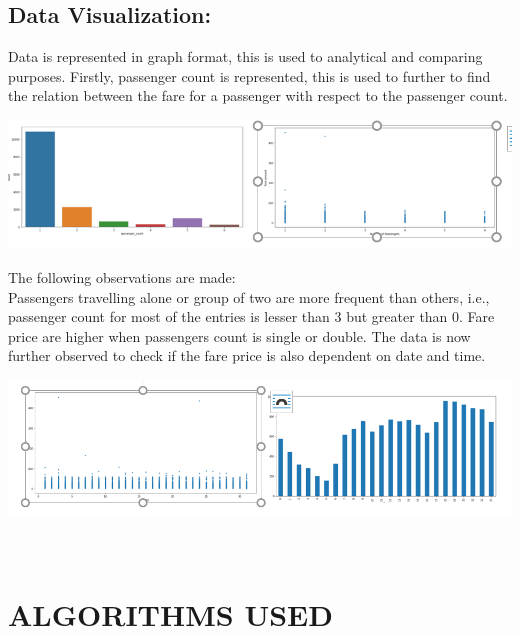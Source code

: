 \documentclass[journal,twoside,web]{ieeecolor}
\begin{document}
\subsection{Data Visualization:}
Data is represented in graph format,  this  is  used  to analytical and comparing purposes. Firstly, passenger count is represented, this is used to further to find the relation between the fare for a passenger with respect to the passenger count. 
\\
\begin{center}
\includegraphics[scale=0.50]{Picture11.png}
\end{center}
The following observations are made:
\\
Passengers travelling alone or group of two are more frequent than others, i.e., passenger count for most of the entries is lesser than 3 but greater than 0.
Fare price are higher when passengers count is single or double.
The data is now further observed to check if the fare price is also dependent on date and time.
\begin{center}
\includegraphics[scale=0.50]{Picture12.png}
\end{center}
\\
\section{ALGORITHMS USED}
\label{ALGORITHMS USED}
\end{document}
